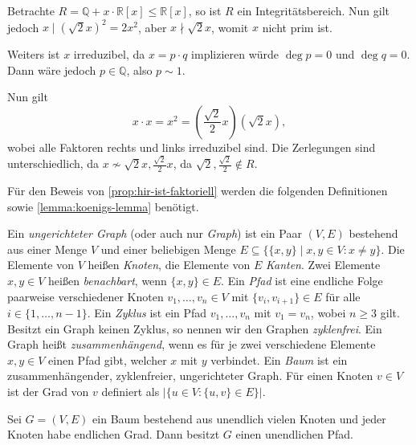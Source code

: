 \begin{example}
    Betrachte $R = \mathbb{Q} + x \cdot \mathbb{R}[x] \leq \mathbb{R}[x]$, so ist $R$ ein Integritätsbereich. Nun gilt jedoch $x \mid (\sqrt{2} x)^2 = 2x^2$, aber $x \nmid \sqrt{2}x$, womit $x$ nicht prim ist.
    
    Weiters ist $x$ irreduzibel, da $x = p \cdot q$ implizieren würde $\deg{p} = 0$ und $\deg{q} = 0$. Dann wäre jedoch $p \in \mathbb{Q}$, also $p \sim 1$.
    
    Nun gilt
    $$ x \cdot x = x^2 = \left(\frac{\sqrt{2}}{2} x\right)(\sqrt{2}x), $$
    wobei alle Faktoren rechts und links irreduzibel sind. Die Zerlegungen sind unterschiedlich, da $x \not\sim \sqrt{2} x, \frac{\sqrt{2}}{2} x$, da $\sqrt{2}, \frac{\sqrt{2}}{2} \notin R$.
\end{example}

Für den Beweis von \cref{prop:hir-ist-faktoriell} werden die folgenden Definitionen sowie \cref{lemma:koenigs-lemma} benötigt.


\begin{definition}
    Ein \emph{ungerichteter Graph} (oder auch nur \emph{Graph}) ist ein Paar $(V,E)$ bestehend aus einer Menge $V$ und einer beliebigen Menge $E\subseteq\{\{x,y\}\mid x,y\in V: x\neq y\}$. Die Elemente von $V$ heißen \emph{Knoten}, die Elemente von $E$ \emph{Kanten}. Zwei Elemente $x,y\in V$ heißen \emph{benachbart}, wenn $\{x,y\}\in E$. Ein \emph{Pfad} ist eine endliche Folge paarweise verschiedener Knoten $v_1,\ldots,v_n\in V$ mit $\{v_i,v_{i+1}\}\in E$ für alle $i\in\{1,\ldots,n-1\}$.
    Ein \emph{Zyklus} ist ein Pfad $v_1,\ldots,v_n$ mit $v_1=v_n$, wobei $n\geq 3$ gilt. Besitzt ein Graph keinen Zyklus, so nennen wir den Graphen \emph{zyklenfrei}. Ein Graph heißt \emph{zusammenhängend}, wenn es für je zwei verschiedene Elemente $x,y\in V$ einen Pfad gibt, welcher $x$ mit $y$ verbindet. Ein \emph{Baum} ist ein zusammenhängender, zyklenfreier, ungerichteter Graph. Für einen Knoten $v\in V$ ist der Grad von $v$ definiert als $|\{u\in V:\{u,v\}\in E\}|$.
\end{definition}

\begin{lemma}  \label{lemma:koenigs-lemma}
    Sei $G=(V,E)$ ein Baum bestehend aus unendlich vielen Knoten und jeder Knoten habe endlichen Grad. Dann besitzt $G$ einen unendlichen Pfad.
\end{lemma}

